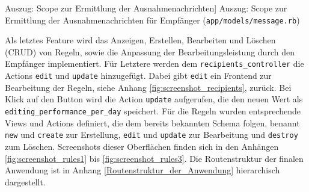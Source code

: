 \begin{listing}[!ht]
\inputminted[firstline=6, lastline=15, linenos]{ruby}{Listings/Pkg3/message.rb}

\caption
    [Auszug: Scope zur Ermittlung der Ausnahmenachrichten]
    {Auszug: Scope zur Ermittlung der Ausnahmenachrichten für Empfänger (\texttt{app/models/message.rb})}

\label{lst:message3}
\end{listing}

\noindent Als letztes Feature wird das Anzeigen, Erstellen, Bearbeiten und Löschen (CRUD) von Regeln, sowie die Anpassung der Bearbeitungsleistung durch den Empfänger implementiert. Für Letztere werden dem \texttt{recipients\_controller} die Actions \texttt{edit} und \texttt{update} hinzugefügt. Dabei gibt \texttt{edit} ein Frontend zur Bearbeitung der Regeln, siehe Anhang \ref{fig:screenshot_recipients}, zurück. Bei Klick auf den Button wird die Action \texttt{update} aufgerufen, die den neuen Wert als \texttt{editing\_performance\_per\_day} speichert. Für die Regeln wurden entsprechende Views und Actions definiert, die dem bereits bekannten Schema folgen, benannt \texttt{new} und \texttt{create} zur Erstellung, \texttt{edit} und \texttt{update} zur Bearbeitung und \texttt{destroy} zum Löschen. Screenshots dieser Oberflächen finden sich in den Anhängen \ref{fig:screenshot_rules1} bis \ref{fig:screenshot_rules3}. Die Routenstruktur der finalen Anwendung ist in Anhang \ref{Routenstruktur_der_Anwendung} hierarchisch dargestellt.